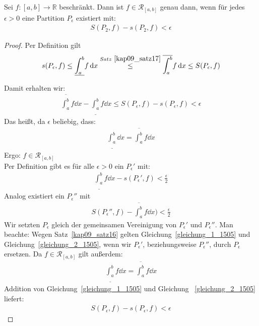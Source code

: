 \begin{Satz}{\label{kap_10_satz18}
	Sei $f: [a,b] \rightarrow \mathbb{R}$ beschränkt. Dann ist 
	$f \in \mathcal{R}_{[a,b]}$ genau dann, wenn für jedes $\epsilon > 0$ eine 
	Partition $P_{\epsilon}$ existiert mit:
	\begin{align*}
		S(P_2,f) - s(P_2,f) < \epsilon
	\end{align*}
}\end{Satz}

\begin{proof}
	 Per Definition gilt 
	\begin{align*}
		s(P_{\epsilon},f) \leq \underline{\int_{a}^b} f \dd{x}
		\overset{Satz~\ref{kap09_satz17}}{\le} \overline{\int_a^b} f \dd{x} 
		\leq S(P_{\epsilon},f) 		
	\end{align*}

	Damit erhalten wir:
	\begin{align*}
		\overline{\int_a^b} f \dd{x} - 
		\underline{\int_{a}^b} f \dd{x} \leq S(P_{\epsilon},f) 
		- s(P_{\epsilon},f) < \epsilon
	\end{align*}
	Das heißt, da $\epsilon$ beliebig, dass:
	\begin{align*}
		\underline{\int_{a}^b} \dd{x} = \overline{\int_a^b} f \dd{x}
	\end{align*}
	Ergo: $f \in \mathcal{R}_{[a,b]}$ \\
	Per Definition gibt es für alle $\epsilon > 0$ ein $P_{\epsilon}'$ mit:
	\begin{align}
		\label{gleichung_1_1505}
		\underline{\int_{a}^b} f \dd{x} - s(P_{\epsilon}',f) < \frac{\epsilon}{2} 
	\end{align}
	Analog existiert ein $P_{\epsilon}''$ mit 
	\begin{align}
		\label{gleichung_2_1505}
		S(P_{\epsilon}'',f) - \overline{\int_a^{b}} f \dd{x}) < \frac{\epsilon}{2}
	\end{align}
	Wir setzten $P_{\epsilon}$ gleich der gemeinsamen Vereinigung von 
	$P_{\epsilon}'$ und $P_{\epsilon}''$. Man beachte: Wegen Satz~\ref{kap09_satz16} 
	gelten Gleichung~\ref{gleichung_1_1505} und Gleichung~\ref{gleichung_2_1505},
	wenn wir $P_{\epsilon}'$, beziehungsweise $P_{\epsilon}''$, durch $P_{\epsilon}$
	ersetzen. Da $f \in \mathcal{R}_{[a,b]}$ gilt außerdem:
	\begin{align*}
		\underline{\int_{a}^b} f \dd{x} = \overline{\int_a^{b}} f\dd{x}
	\end{align*}	 
	Addition von Gleichung~\ref{gleichung_1_1505} und Gleichung~
	\ref{gleichung_2_1505} liefert:
	\begin{align*}
	S(P_{\epsilon},f) - s(P_{\epsilon},f) < \epsilon
	\end{align*}
\end{proof}

